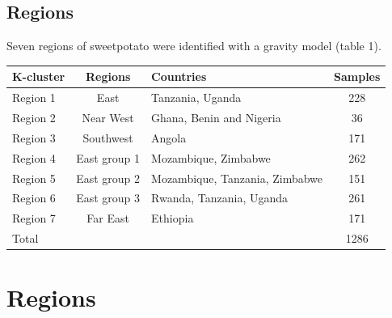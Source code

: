 \documentclass{article}
\begin{document}

\subsection{Regions}
\label{Sweetpotato regions}
Seven regions of sweetpotato were identified with a gravity model (table 1).

\begin{table}[h!]
\begin{tabular}{lclc}
\hline \hline
K-cluster  & Regions      	& Countries                      			& Samples \\ \hline
Region 1  & East           	& Tanzania, Uganda                			& 228        \\
Region 2  & Near West      & Ghana, Benin and Nigeria      		& 36          \\
Region 3  & Southwest      & Angola                         				& 171        \\
Region 4  & East group 1   & Mozambique, Zimbabwe           		& 262         \\
Region 5  & East group 2   & Mozambique, Tanzania, Zimbabwe 	& 151         \\
Region 6  & East group 3   & Rwanda, Tanzania, Uganda       		& 261         \\
Region 7  & Far East       	& Ethiopia                      	 			& 171         \\ 
Total     	  &                	&                                				& 1286       \\  
\hline \hline
\end{tabular}
\end{table}

 

\section{Regions}
\end{document}
